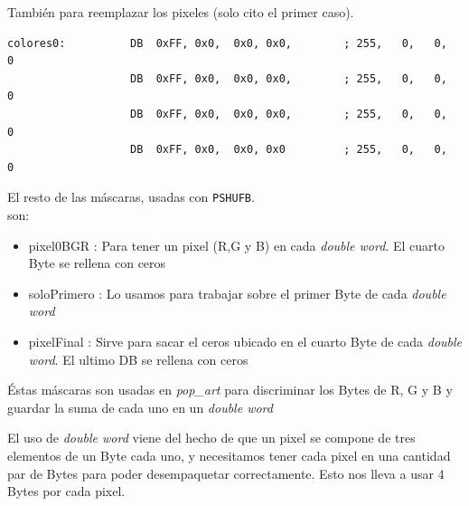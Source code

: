Tambi\'en para reemplazar los pixeles (solo cito el primer caso).
\begin{codesnippet}
\begin{verbatim}
colores0:          DB  0xFF, 0x0,  0x0, 0x0,        ; 255,   0,   0,   0
                   DB  0xFF, 0x0,  0x0, 0x0,        ; 255,   0,   0,   0
                   DB  0xFF, 0x0,  0x0, 0x0,        ; 255,   0,   0,   0
                   DB  0xFF, 0x0,  0x0, 0x0         ; 255,   0,   0,   0

\end{verbatim}
\end{codesnippet}
El resto de las m\'ascaras, usadas con \verb|PSHUFB|.\\ son:

\begin{itemize}
	\item pixel0BGR : Para tener un pixel (R,G y B) en cada \textit{double word}. El cuarto Byte se rellena con ceros
			
	\item soloPrimero : Lo usamos para trabajar sobre el primer Byte de cada \textit{double word}
		
	\item pixelFinal : Sirve para sacar el ceros ubicado en el cuarto Byte de cada \textit{double word}. El ultimo DB se rellena con ceros
\end{itemize}
\'Estas m\'ascaras son usadas en \textit{pop_art} para discriminar los Bytes de R, G y B y guardar la suma de cada uno en un \textit{double word}

El uso de \textit{double word} viene del hecho de que un pixel se compone de tres elementos de un Byte cada uno, 
y necesitamos tener cada pixel en una cantidad par de Bytes para poder desempaquetar correctamente. Esto nos lleva a usar 4 Bytes por cada pixel.

